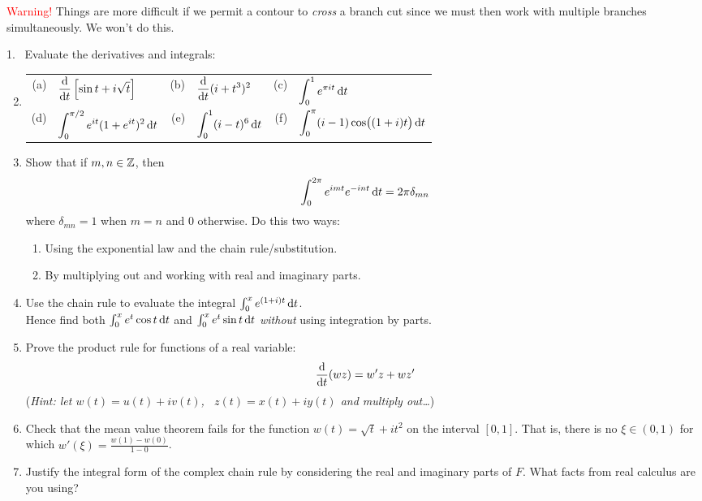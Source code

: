\textcolor{red}{Warning!} Things are more difficult if we permit a contour to \emph{cross} a branch cut since we must then work with multiple branches simultaneously. We won't do this.
\goodbreak


\begin{exercises*}
\hangindent\leftmargini
\textup{1.} \ Evaluate the derivatives and integrals:
\begin{enumerate}\setcounter{enumi}{1}
  \item[]\begin{tabular}[t]{r@{\ \ }l@{\qquad}r@{\ \ }l@{\qquad}r@{\ \ }l}
  (a)&
  $\displaystyle\frac{\mathrm{d} }{\mathrm{d} t}\left[\sin t+i\sqrt t\right]$&
  (b)&
  $\displaystyle\frac{\mathrm{d} }{\mathrm{d} t}(i+t^3)^2$&
  (c)&
  $\displaystyle\int_0^1e^{\pi it}\,{\mathrm{d} t}$\\[10pt]
	(d)&
	$\displaystyle\int_0^{\pi/2} e^{it}(1+e^{it})^2\,{\mathrm{d} t}$&
  (e)&
  $\displaystyle\int_0^1(i-t)^6\,{\mathrm{d} t}$&
	(f)&
	$\displaystyle\int_0^{\pi} (i-1)\cos\bigl((1+i)t\bigr)\,{\mathrm{d} t}$
  \end{tabular}
  
  \item Show that if $m,n\in\mathbb{Z}$, then
  \[\int_0^{2\pi}e^{imt}e^{-int}\,{\mathrm{d} t}=2\pi\delta_{mn}\]
  where $\delta_{mn}=1$ when $m=n$ and 0 otherwise. Do this two ways:
  \begin{enumerate}
    \item Using the exponential law and the chain rule/substitution.
    \item By multiplying out and working with real and imaginary parts.
  \end{enumerate}
  
  \item Use the chain rule to evaluate the integral $\int_0^xe^{(1+i)t}\,{\mathrm{d} t}$.\\
  Hence find both $\int_0^xe^t\cos t\,{\mathrm{d} t}$ and $\int_0^xe^t\sin t\,{\mathrm{d} t}$ \emph{without} using integration by parts.
  
  \item Prove the product rule for functions of a real variable:
  \[\frac{\mathrm{d} }{\mathrm{d} t}(wz)=w'z+wz'\]
  (\emph{Hint: let $w(t)=u(t)+iv(t)$, \ $z(t)=x(t)+iy(t)$ and multiply out\ldots})
  
  \item Check that the mean value theorem fails for the function $w(t)=\sqrt t+it^2$ on the interval $[0,1]$. That is, there is no $\xi\in(0,1)$ for which $w'(\xi)=\frac{w(1)-w(0)}{1-0}$.
  
  \item Justify the integral form of the complex chain rule by considering the real and imaginary parts of $F$. What facts from real calculus are you using?
  

\end{enumerate}
\end{exercises*}
